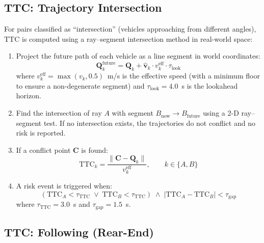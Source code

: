 \documentclass[12pt]{report}
\begin{document}
\subsection{TTC: Trajectory Intersection}

For pairs classified as ``intersection'' (vehicles approaching from different angles), TTC is computed using a ray--segment intersection method in real-world space:

\begin{enumerate}
    \item Project the future path of each vehicle as a line segment in world coordinates:
    \begin{equation}
        \mathbf{Q}_k^\text{future} = \mathbf{Q}_k + \hat{\mathbf{v}}_k \cdot v_k^\text{eff} \cdot \tau_\text{look}
        \label{eq:future_path}
    \end{equation}
    where $v_k^\text{eff} = \max(v_k, 0.5)$~m/s is the effective speed (with a minimum floor to ensure a non-degenerate segment) and $\tau_\text{look} = 4.0$~s is the lookahead horizon.

    \item Find the intersection of ray $A$ with segment $B_\text{now} \to B_\text{future}$ using a 2-D ray--segment test.
    If no intersection exists, the trajectories do not conflict and no risk is reported.

    \item If a conflict point $\mathbf{C}$ is found:
    \begin{equation}
        \text{TTC}_k = \frac{\|\mathbf{C} - \mathbf{Q}_k\|}{v_k^\text{eff}}, \qquad k \in \{A, B\}
        \label{eq:ttc_intersection}
    \end{equation}

    \item A risk event is triggered when:
    \begin{equation}
        (\text{TTC}_A < \tau_\text{TTC} \;\lor\; \text{TTC}_B < \tau_\text{TTC})
        \;\land\;
        |\text{TTC}_A - \text{TTC}_B| < \tau_\text{gap}
        \label{eq:ttc_risk_condition}
    \end{equation}
    where $\tau_\text{TTC} = 3.0$~s and $\tau_\text{gap} = 1.5$~s.
\end{enumerate}

\subsection{TTC: Following (Rear-End)}
\end{document}
